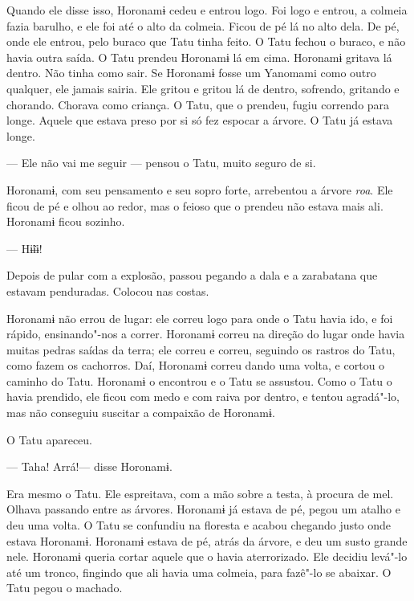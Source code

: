 Quando ele disse isso, Horonamɨ cedeu e entrou logo. Foi logo e entrou,
a colmeia fazia barulho, e ele foi até o alto da colmeia. Ficou de pé lá
no alto dela. De pé, onde ele entrou, pelo buraco que Tatu tinha feito.
O Tatu fechou o buraco, e não havia outra saída. O Tatu prendeu Horonamɨ
lá em cima. Horonamɨ gritava lá dentro. Não tinha como sair. Se Horonamɨ
fosse um Yanomami como outro qualquer, ele jamais sairia. Ele gritou e
gritou lá de dentro, sofrendo, gritando e chorando. Chorava como
criança. O Tatu, que o prendeu, fugiu correndo para longe. Aquele que
estava preso por si só fez espocar a árvore. O Tatu já estava longe. 

--- Ele não vai me seguir --- pensou o Tatu, muito seguro de si. 

Horonamɨ, com seu pensamento e seu sopro forte, arrebentou a
árvore \emph{roa}. Ele ficou de pé e olhou ao redor, mas o feioso que o
prendeu não estava mais ali. Horonamɨ ficou sozinho. 

--- Hɨ̃ɨɨ! 

Depois de pular com a explosão, passou pegando a dala e a zarabatana que
estavam penduradas. Colocou nas costas. 


Horonamɨ não errou de lugar: ele correu logo para onde o Tatu havia ido,
e foi rápido, ensinando"-nos a correr. Horonamɨ correu na direção do
lugar onde havia muitas pedras saídas da terra; ele correu e correu,
seguindo os rastros do Tatu, como fazem os cachorros. Daí, Horonamɨ
correu dando uma volta, e cortou o caminho do Tatu. Horonamɨ o
encontrou e o Tatu se assustou. Como o Tatu o havia prendido, ele ficou
com medo e com raiva por dentro, e tentou agradá"-lo, mas não conseguiu
suscitar a compaixão de Horonamɨ. 

O Tatu apareceu.

--- Taha! Arrá!--- disse Horonamɨ. 

Era mesmo o Tatu. Ele espreitava, com a mão sobre a testa, à procura de
mel. Olhava passando entre as árvores. Horonamɨ já estava de pé, pegou
um atalho e deu uma volta. O Tatu se confundiu na floresta e acabou
chegando justo onde estava Horonamɨ. Horonamɨ estava de pé, atrás da
árvore, e deu um susto grande nele. Horonamɨ queria cortar aquele que o
havia aterrorizado. Ele decidiu levá"-lo até um tronco, fingindo que ali
havia uma colmeia, para fazê"-lo se abaixar. O Tatu pegou o machado. 

